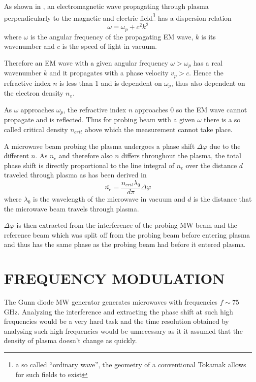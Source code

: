 \documentclass[a4paper,twoside]{articlek}
\begin{document}
As shown in \cite{mateju}, an electromagnetic wave propagating through plasma perpendicularly to the magnetic and electric field\footnote{a so called ``ordinary wave'', the geometry of a conventional Tokamak allows for such fields to exist} has a dispersion relation
\begin{equation}
    \omega = \omega_p +c^2 k^2
    \label{eq:dispersion}
\end{equation}
where $\omega$ is the angular frequency of the propagating EM wave, $k$ is its wavenumber and $c$ is the speed of light in vacuum.

Therefore an EM wave with a given angular frequency $\omega>\omega_p$ has a real wavenumber $k$ and it propagates with a phase velocity $v_p>c$. Hence the refractive index $n$ is less than 1 and is dependent on $\omega_p$, thus also dependent on the electron density $n_e$. 

As $\omega$ approaches $\omega_p$, the refractive index $n$ approaches 0 so the EM wave cannot propagate and is reflected. Thus for probing beam with a given $\omega$ there is a so called critical density $n_{crit}$ above which the measurement cannot take place.


A microwave beam probing the plasma undergoes a phase shift $\Delta \varphi$ due to the different $n$.  %
As $n_e$ and therefore also $n$ differs throughout the plasma, the total phase shift is directly proportional to the line integral of $n_e$ over the distance $d$ traveled through plasma as has been derived in \cite{mateju}
\begin{equation}
    \overline{n_e}=\frac{ n_{crit}\lambda_0 }{d \pi}\Delta \varphi
    \label{eq:ne}
\end{equation}
where $\lambda_0$ is the wavelength of the microwave in vacuum and $d$ is the distance that the microwave beam travels through plasma. 

$\Delta \varphi$ is then extracted from the interference of the probing MW beam and the reference beam which was split off from the probing beam before entering plasma and thus has the same phase as the probing beam had before it entered plasma.

\section{FREQUENCY MODULATION}

The Gunn diode MW generator generates microwaves with frequencies $f \sim 75$ GHz. Analyzing the interference and extracting the phase shift at such high frequencies would be a very hard task and the time resolution obtained by analysing such high frequencies would be unnecessary as it it assumed that the density of plasma doesn't change as quickly.
\end{document}
